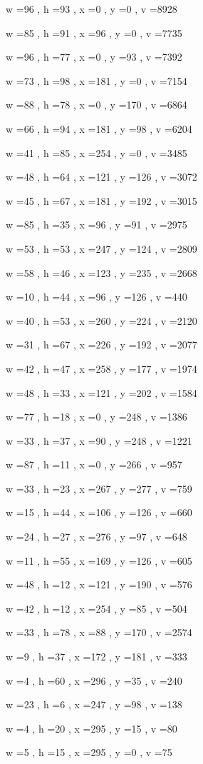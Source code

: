 \documentclass[11pt]{article}
\begin{document}
w =96 , h =93 , x =0 , y =0 , v =8928
\par
w =85 , h =91 , x =96 , y =0 , v =7735
\par
w =96 , h =77 , x =0 , y =93 , v =7392
\par
w =73 , h =98 , x =181 , y =0 , v =7154
\par
w =88 , h =78 , x =0 , y =170 , v =6864
\par
w =66 , h =94 , x =181 , y =98 , v =6204
\par
w =41 , h =85 , x =254 , y =0 , v =3485
\par
w =48 , h =64 , x =121 , y =126 , v =3072
\par
w =45 , h =67 , x =181 , y =192 , v =3015
\par
w =85 , h =35 , x =96 , y =91 , v =2975
\par
w =53 , h =53 , x =247 , y =124 , v =2809
\par
w =58 , h =46 , x =123 , y =235 , v =2668
\par
w =10 , h =44 , x =96 , y =126 , v =440
\par
w =40 , h =53 , x =260 , y =224 , v =2120
\par
w =31 , h =67 , x =226 , y =192 , v =2077
\par
w =42 , h =47 , x =258 , y =177 , v =1974
\par
w =48 , h =33 , x =121 , y =202 , v =1584
\par
w =77 , h =18 , x =0 , y =248 , v =1386
\par
w =33 , h =37 , x =90 , y =248 , v =1221
\par
w =87 , h =11 , x =0 , y =266 , v =957
\par
w =33 , h =23 , x =267 , y =277 , v =759
\par
w =15 , h =44 , x =106 , y =126 , v =660
\par
w =24 , h =27 , x =276 , y =97 , v =648
\par
w =11 , h =55 , x =169 , y =126 , v =605
\par
w =48 , h =12 , x =121 , y =190 , v =576
\par
w =42 , h =12 , x =254 , y =85 , v =504
\par
w =33 , h =78 , x =88 , y =170 , v =2574
\par
w =9 , h =37 , x =172 , y =181 , v =333
\par
w =4 , h =60 , x =296 , y =35 , v =240
\par
w =23 , h =6 , x =247 , y =98 , v =138
\par
w =4 , h =20 , x =295 , y =15 , v =80
\par
w =5 , h =15 , x =295 , y =0 , v =75
\par
\newpage
\end{document}
